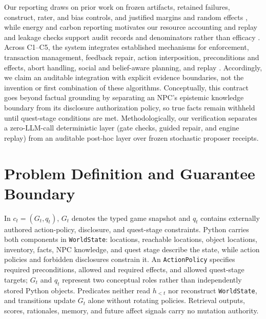 \documentclass[journal]{IEEEtran}
\begin{document}
Our reporting draws on prior work on frozen artifacts, retained failures, construct, rater, and bias controls, and justified margins and random effects \cite{S31_agarwal2021precipice,S33_pineau2021reproducibility,S27_vanderlee2019best,S28_karpinska2021perils,S29_zheng2023judging,S30_chen2024judgement,S32_lakens2018equivalence,S35_barr2013random}, while energy and carbon reporting motivates our resource accounting \cite{S34_henderson2020energy} and replay and leakage checks support audit records and denominators rather than efficacy \cite{S56_feng2025agentrr,S59_sun2025bdc}. Across C1--C5, the system integrates established mechanisms for enforcement, transaction management, feedback repair, action interposition, preconditions and effects, abort handling, social and belief-aware planning, and replay \cite{S52_wang2025agentspec,S53_li2025settingdc,S54_zhou2025story2game,S45_madaan2023selfrefine,S56_feng2025agentrr,S37_riedl2003managing,S39_fikes1971strips,S40_schneider2000enforceable,S49_haerder1983transaction,S38_evans2013versu,S41_ware2021sabre}. Accordingly, we claim an auditable integration with explicit evidence boundaries, not the invention or first combination of these algorithms.
Conceptually, this contract goes beyond factual grounding by separating an NPC's epistemic knowledge boundary from its disclosure authorization policy, so true facts remain withheld until quest-stage conditions are met. Methodologically, our verification separates a zero-LLM-call deterministic layer (gate checks, guided repair, and engine replay) from an auditable post-hoc layer over frozen stochastic proposer receipts.

\section{Problem Definition and Guarantee Boundary}
In $c_t=(G_t,q_t)$, $G_t$ denotes the typed game snapshot and $q_t$ contains externally authored action-policy, disclosure, and quest-stage constraints. Python carries both components in \texttt{WorldState}: locations, reachable locations, object locations, inventory, facts, NPC knowledge, and quest stage describe the state, while action policies and forbidden disclosures constrain it. An \texttt{ActionPolicy} specifies required preconditions, allowed and required effects, and allowed quest-stage targets; $G_t$ and $q_t$ represent two conceptual roles rather than independently stored Python objects. Predicates neither read $h_{<t}$ nor reconstruct \texttt{WorldState}, and transitions update $G_t$ alone without rotating policies. Retrieval outputs, scores, rationales, memory, and future affect signals carry no mutation authority.
\end{document}
